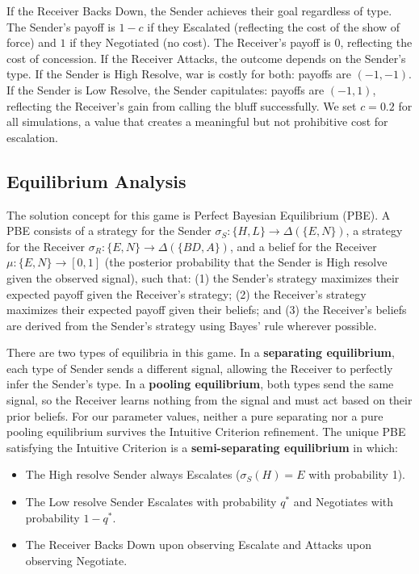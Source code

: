 \documentclass[12pt]{article}
\theoremstyle{plain}
\theoremstyle{definition}
\begin{document}
If the Receiver Backs Down, the Sender achieves their goal regardless of type. The Sender's payoff is $1 - c$ if they Escalated (reflecting the cost of the show of force) and $1$ if they Negotiated (no cost). The Receiver's payoff is $0$, reflecting the cost of concession. If the Receiver Attacks, the outcome depends on the Sender's type. If the Sender is High Resolve, war is costly for both: payoffs are $(-1, -1)$. If the Sender is Low Resolve, the Sender capitulates: payoffs are $(-1, 1)$, reflecting the Receiver's gain from calling the bluff successfully. We set $c = 0.2$ for all simulations, a value that creates a meaningful but not prohibitive cost for escalation.

\subsection{Equilibrium Analysis}

The solution concept for this game is Perfect Bayesian Equilibrium (PBE). A PBE consists of a strategy for the Sender $\sigma_S: \{H, L\} \rightarrow \Delta(\{E, N\})$, a strategy for the Receiver $\sigma_R: \{E, N\} \rightarrow \Delta(\{BD, A\})$, and a belief for the Receiver $\mu: \{E, N\} \rightarrow [0,1]$ (the posterior probability that the Sender is High resolve given the observed signal), such that: (1) the Sender's strategy maximizes their expected payoff given the Receiver's strategy; (2) the Receiver's strategy maximizes their expected payoff given their beliefs; and (3) the Receiver's beliefs are derived from the Sender's strategy using Bayes' rule wherever possible.

There are two types of equilibria in this game. In a \textbf{separating equilibrium}, each type of Sender sends a different signal, allowing the Receiver to perfectly infer the Sender's type. In a \textbf{pooling equilibrium}, both types send the same signal, so the Receiver learns nothing from the signal and must act based on their prior beliefs. For our parameter values, neither a pure separating nor a pure pooling equilibrium survives the Intuitive Criterion refinement. The unique PBE satisfying the Intuitive Criterion is a \textbf{semi-separating equilibrium} in which:

\begin{itemize}
    \item The High resolve Sender always Escalates ($\sigma_S(H) = E$ with probability 1).
    \item The Low resolve Sender Escalates with probability $q^*$ and Negotiates with probability $1 - q^*$.
    \item The Receiver Backs Down upon observing Escalate and Attacks upon observing Negotiate.
\end{itemize}
\end{document}
